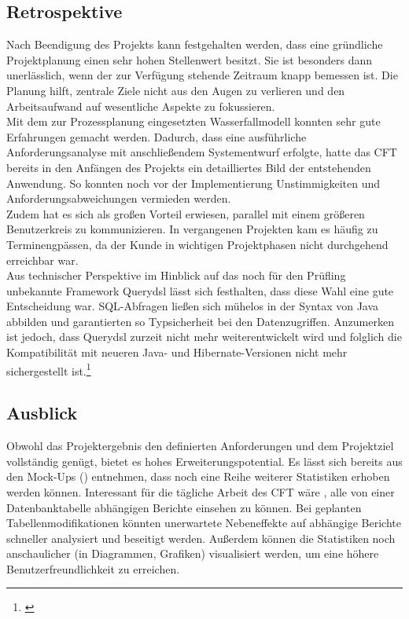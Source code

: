 \subsection{Retrospektive}\label{sec:Retrospektive}
Nach Beendigung des Projekts kann festgehalten werden, dass eine gründliche Projektplanung einen sehr hohen Stellenwert besitzt. Sie ist besonders dann unerlässlich, wenn der zur Verfügung stehende Zeitraum knapp bemessen ist. Die Planung hilft, zentrale Ziele nicht aus den Augen zu verlieren und den Arbeitsaufwand auf wesentliche Aspekte zu fokussieren. \\
Mit dem zur Prozessplanung eingesetzten Wasserfallmodell konnten sehr gute Erfahrungen gemacht werden. Dadurch, dass eine ausführliche Anforderungsanalyse mit anschließendem Systementwurf erfolgte, hatte das \ac{CFT} \teamName bereits in den Anfängen des Projekts ein detailliertes Bild der entstehenden Anwendung. So konnten noch vor der Implementierung Unstimmigkeiten und Anforderungsabweichungen vermieden werden. \\
Zudem hat es sich als großen Vorteil erwiesen, parallel mit einem größeren Benutzerkreis zu kommunizieren. In vergangenen Projekten kam es häufig zu Terminengpässen, da der Kunde in wichtigen Projektphasen nicht durchgehend erreichbar war. \\
Aus technischer Perspektive im Hinblick auf das noch für den Prüfling unbekannte Framework Querydsl lässt sich festhalten, dass diese Wahl eine gute Entscheidung war. SQL-Abfragen ließen sich mühelos in der Syntax von Java abbilden und garantierten so Typsicherheit bei den Datenzugriffen. Anzumerken ist jedoch, dass Querydsl zurzeit nicht mehr weiterentwickelt wird und folglich die Kompatibilität mit neueren Java- und Hibernate-Versionen nicht mehr sichergestellt ist.\footnote{\cite{github:qdsl}}

\subsection{Ausblick}\label{sec:Ausblick}
Obwohl das Projektergebnis den definierten Anforderungen und dem Projektziel vollständig genügt, bietet es hohes Erweiterungspotential. Es lässt sich bereits aus den Mock-Ups () entnehmen, dass noch eine Reihe weiterer Statistiken erhoben werden können. Interessant für die tägliche Arbeit des \ac{CFT} \teamName wäre \zB, alle von einer Datenbanktabelle abhängigen Berichte einsehen zu können. Bei geplanten Tabellenmodifikationen könnten unerwartete Nebeneffekte auf abhängige Berichte schneller analysiert und beseitigt werden.  Außerdem können die Statistiken noch anschaulicher (\zB in Diagrammen, Grafiken) visualisiert werden, um eine höhere Benutzerfreundlichkeit zu erreichen.